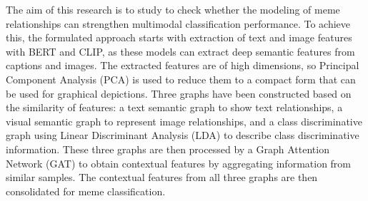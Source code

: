 \documentclass[a4paper]{cas-sc}
\begin{document}
The aim of this research is to study to check whether the modeling of meme relationships can strengthen multimodal classification performance. To achieve this, the formulated approach starts with extraction of text and image features with BERT and CLIP, as these models can extract deep semantic features from captions and images. The extracted features are of high dimensions, so Principal Component Analysis (PCA) is used to reduce them to a compact form that can be used for graphical depictions. Three graphs have been constructed based on the similarity of features: a text semantic graph to show text relationships, a visual semantic graph to represent image relationships, and a class discriminative graph using Linear Discriminant Analysis (LDA) to describe class discriminative information. These three graphs are then processed by a Graph Attention Network (GAT) to obtain contextual features by aggregating information from similar samples. The contextual features from all three graphs are then consolidated for meme classification.









\end{document}
